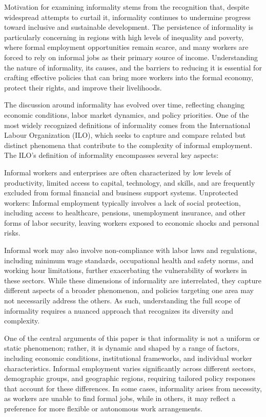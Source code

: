 \documentclass[english]{article}
\begin{document}
Motivation for examining informality stems from the recognition that, despite widespread attempts to curtail it, informality continues to undermine progress toward inclusive and sustainable development. The persistence of informality is particularly concerning in regions with high levels of inequality and poverty, where formal employment opportunities remain scarce, and many workers are forced to rely on informal jobs as their primary source of income. Understanding the nature of informality, its causes, and the barriers to reducing it is essential for crafting effective policies that can bring more workers into the formal economy, protect their rights, and improve their livelihoods.

The discussion around informality has evolved over time, reflecting changing economic conditions, labor market dynamics, and policy priorities. One of the most widely recognized definitions of informality comes from the International Labour Organization (ILO), which seeks to capture and compare related but distinct phenomena that contribute to the complexity of informal employment. The ILO’s definition of informality encompasses several key aspects:

Informal workers and enterprises are often characterized by low levels of productivity, limited access to capital, technology, and skills, and are frequently excluded from formal financial and business support systems.
Unprotected workers: Informal employment typically involves a lack of social protection, including access to healthcare, pensions, unemployment insurance, and other forms of labor security, leaving workers exposed to economic shocks and personal risks.

Informal work may also involve non-compliance with labor laws and regulations, including minimum wage standards, occupational health and safety norms, and working hour limitations, further exacerbating the vulnerability of workers in these sectors. While these dimensions of informality are interrelated, they capture different aspects of a broader phenomenon, and policies targeting one area may not necessarily address the others. As such, understanding the full scope of informality requires a nuanced approach that recognizes its diversity and complexity.

One of the central arguments of this paper is that informality is not a uniform or static phenomenon; rather, it is dynamic and shaped by a range of factors, including economic conditions, institutional frameworks, and individual worker characteristics. Informal employment varies significantly across different sectors, demographic groups, and geographic regions, requiring tailored policy responses that account for these differences. In some cases, informality arises from necessity, as workers are unable to find formal jobs, while in others, it may reflect a preference for more flexible or autonomous work arrangements.
\end{document}

